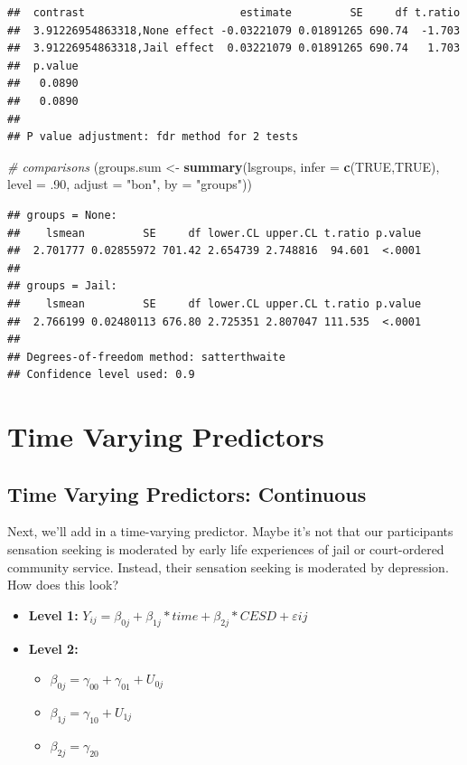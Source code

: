 \documentclass[]{article}
\newenvironment{Shaded}{\begin{snugshade}}{\end{snugshade}}
\newcommand{\KeywordTok}[1]{\textcolor[rgb]{0.13,0.29,0.53}{\textbf{#1}}}
\newcommand{\DataTypeTok}[1]{\textcolor[rgb]{0.13,0.29,0.53}{#1}}
\newcommand{\DecValTok}[1]{\textcolor[rgb]{0.00,0.00,0.81}{#1}}
\newcommand{\StringTok}[1]{\textcolor[rgb]{0.31,0.60,0.02}{#1}}
\newcommand{\CommentTok}[1]{\textcolor[rgb]{0.56,0.35,0.01}{\textit{#1}}}
\newcommand{\OtherTok}[1]{\textcolor[rgb]{0.56,0.35,0.01}{#1}}
\newcommand{\NormalTok}[1]{#1}
\begin{document}
\begin{verbatim}
##  contrast                        estimate         SE     df t.ratio
##  3.91226954863318,None effect -0.03221079 0.01891265 690.74  -1.703
##  3.91226954863318,Jail effect  0.03221079 0.01891265 690.74   1.703
##  p.value
##   0.0890
##   0.0890
## 
## P value adjustment: fdr method for 2 tests
\end{verbatim}

\begin{Shaded}
\begin{Highlighting}[]
\CommentTok{# comparisons}
\NormalTok{(groups.sum <-}\StringTok{ }\KeywordTok{summary}\NormalTok{(lsgroups, }\DataTypeTok{infer =} \KeywordTok{c}\NormalTok{(}\OtherTok{TRUE}\NormalTok{,}\OtherTok{TRUE}\NormalTok{), }
          \DataTypeTok{level =}\NormalTok{ .}\DecValTok{90}\NormalTok{, }\DataTypeTok{adjust =} \StringTok{"bon"}\NormalTok{, }\DataTypeTok{by =} \StringTok{"groups"}\NormalTok{))}
\end{Highlighting}
\end{Shaded}

\begin{verbatim}
## groups = None:
##    lsmean         SE     df lower.CL upper.CL t.ratio p.value
##  2.701777 0.02855972 701.42 2.654739 2.748816  94.601  <.0001
## 
## groups = Jail:
##    lsmean         SE     df lower.CL upper.CL t.ratio p.value
##  2.766199 0.02480113 676.80 2.725351 2.807047 111.535  <.0001
## 
## Degrees-of-freedom method: satterthwaite 
## Confidence level used: 0.9
\end{verbatim}

\section{Time Varying Predictors}\label{time-varying-predictors}

\subsection{Time Varying Predictors:
Continuous}\label{time-varying-predictors-continuous}

Next, we'll add in a time-varying predictor. Maybe it's not that our
participants sensation seeking is moderated by early life experiences of
jail or court-ordered community service. Instead, their sensation
seeking is moderated by depression.\\
How does this look?

\begin{itemize}
  \item \textbf{Level 1:} $Y_{ij} = \beta_{0j} + \beta_{1j}*time + \beta_{2j}*CESD + \varepsilon{ij}$
  \item \textbf{Level 2:} 
    \begin{itemize} 
      \item $\beta_{0j} = \gamma_{00} + \gamma_{01} + U_{0j}$
      \item $\beta_{1j} = \gamma_{10} + U_{1j}$
      \item $\beta_{2j} = \gamma_{20}$
    \end{itemize}
\end{itemize}
\end{document}
